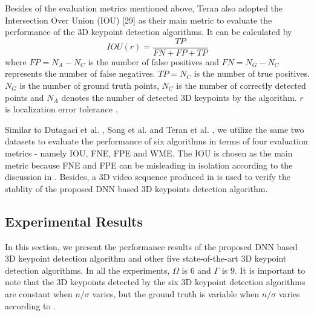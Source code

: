 \documentclass[runningheads]{article}
\begin{document}
Besides of the evaluation metrics mentioned above, Teran \cite{randomforest20143d} also adopted the Intersection Over Union (IOU) [29] as their main metric to evaluate the performance of the 3D keypoint detection algorithms. It can be calculated by
\begin{equation}
	IOU(r) = \frac{TP}{FN+FP+TP}
\end{equation}
where \emph{$FP = N_A-N_C$} is the number of false positives and \emph{$FN = N_G-N_C$} represents the number of false negatives. \emph{$TP = N_C$} is the number of true positives. \emph{$N_G$} is the number of ground truth points, \emph{$N_C$} is the number of correctly detected points and \emph{$N_A$} denotes the number of detected 3D keypoints by the algorithm. \emph{$r$} is localization error tolerance \cite{dutagaci2012evaluation}.

Similar to Dutagaci et al. \cite{dutagaci2012evaluation}, Song et al. \cite{song20133d} and Teran et al. \cite{randomforest20143d}, we utilize the same two datasets to evaluate the performance of six algorithms in terms of four evaluation metrics - namely IOU, FNE, FPE and WME. The IOU is chosen as the main metric because FNE and FPE can be misleading in isolation according to the discussion in \cite{randomforest20143d}. Besides, a 3D video sequence produced in \cite{3Dsequence} is used to verify the stablity of the proposed DNN based 3D keypoints detection algorithm.

\subsection{Experimental Results}
In this section, we present the performance results of the proposed DNN based 3D keypoint detection algorithm and other five state-of-the-art 3D keypoint detection algorithms. In all the experiments, \emph{$\Omega$} is 6 and \emph{$\Gamma$} is 9. It is important to note that the 3D keypoints detected by the six 3D keypoint detection algorithms are constant when \emph{$n/\sigma$} varies, but the ground truth is variable when \emph{$n/\sigma$} varies according to \cite{dutagaci2012evaluation}.
\end{document}
